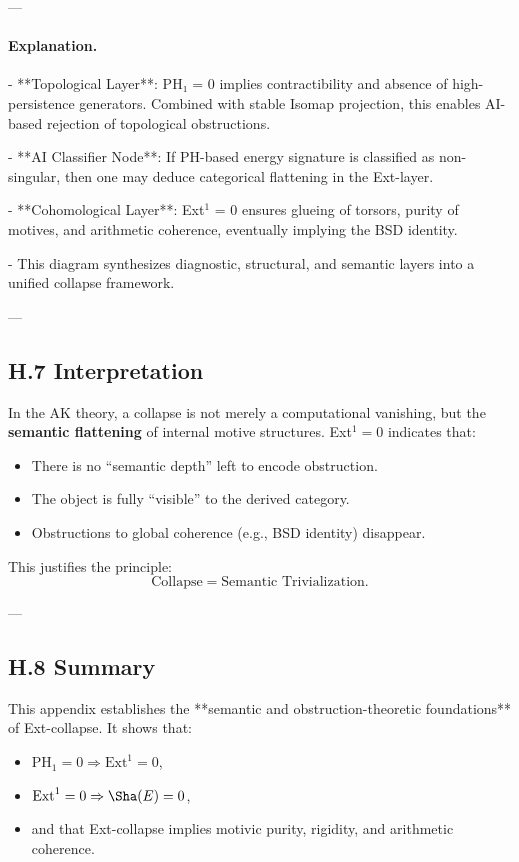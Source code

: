 ---

\paragraph{Explanation.}

- **Topological Layer**: PH₁ = 0 implies contractibility and absence of high-persistence generators.  
  Combined with stable Isomap projection, this enables AI-based rejection of topological obstructions.

- **AI Classifier Node**: If PH-based energy signature is classified as non-singular, then one may deduce categorical flattening in the Ext-layer.

- **Cohomological Layer**: Ext$^1$ = 0 ensures glueing of torsors, purity of motives, and arithmetic coherence, eventually implying the BSD identity.

- This diagram synthesizes diagnostic, structural, and semantic layers into a unified collapse framework.

---

\subsection*{H.7 Interpretation}

In the AK theory, a collapse is not merely a computational vanishing,  
but the \textbf{semantic flattening} of internal motive structures.  
Ext$^1 = 0$ indicates that:

\begin{itemize}
  \item There is no “semantic depth” left to encode obstruction.
  \item The object is fully “visible” to the derived category.
  \item Obstructions to global coherence (e.g., BSD identity) disappear.
\end{itemize}

This justifies the principle:
\[
\text{Collapse} = \text{Semantic Trivialization}.
\]

---

\subsection*{H.8 Summary}

This appendix establishes the **semantic and obstruction-theoretic foundations** of Ext-collapse.  
It shows that:
\begin{itemize}
  \item \( \mathrm{PH}_1 = 0 \Rightarrow \mathrm{Ext}^1 = 0 \),
  \item \( \mathrm{Ext}^1 = 0 \Rightarrow \Sha(E) = 0 \),
  \item and that Ext-collapse implies motivic purity, rigidity, and arithmetic coherence.
\end{itemize}

